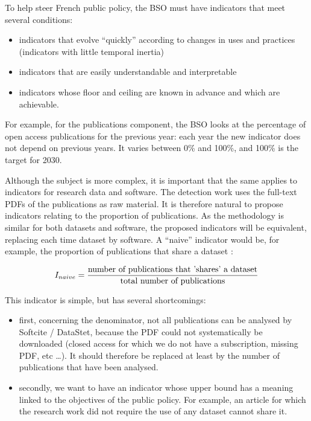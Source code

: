 \documentclass[
]{article}
\begin{document}
To help steer French public policy, the BSO must have indicators that
meet several conditions:

\begin{itemize}
\item
  indicators that evolve ``quickly'' according to changes in uses and
  practices (indicators with little temporal inertia)
\item
  indicators that are easily understandable and interpretable
\item
  indicators whose floor and ceiling are known in advance and which are
  achievable.
\end{itemize}

For example, for the publications component, the BSO looks at the
percentage of open access publications for the previous year: each year
the new indicator does not depend on previous years. It varies between
0\% and 100\%, and 100\% is the target for 2030.

Although the subject is more complex, it is important that the same
applies to indicators for research data and software. The detection work
uses the full-text PDFs of the publications as raw material. It is
therefore natural to propose indicators relating to the proportion of
publications. As the methodology is similar for both datasets and
software, the proposed indicators will be equivalent, replacing each
time dataset by software. A ``naive'' indicator would be, for example,
the proportion of publications that share a dataset :

\[ I_{naive} = {\text{number of publications that 'shares' a dataset} \over \text{total number of publications}} \]

This indicator is simple, but has several shortcomings:

\begin{itemize}
\item
  first, concerning the denominator, not all publications can be
  analysed by Softcite / DataStet, because the PDF could not
  systematically be downloaded (closed access for which we do not have a
  subscription, missing PDF, etc \ldots). It should therefore be
  replaced at least by the number of publications that have been
  analysed.
\item
  secondly, we want to have an indicator whose upper bound has a meaning
  linked to the objectives of the public policy. For example, an article
  for which the research work did not require the use of any dataset
  cannot share it.
\end{itemize}
\end{document}
